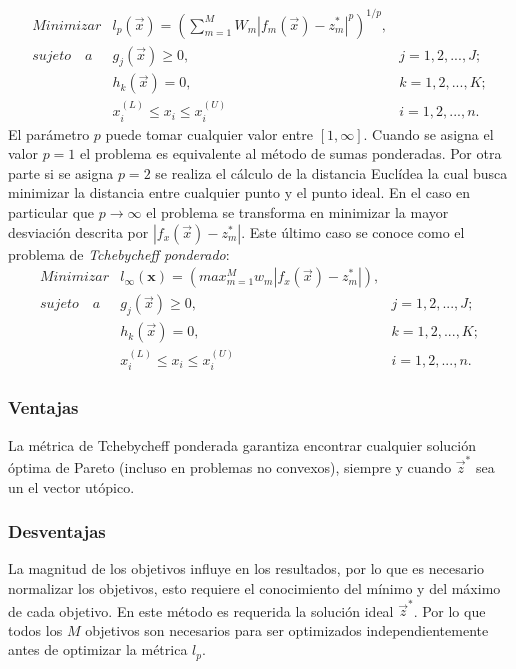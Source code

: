 \begin{equation} \label{eqn:Metodo_Metricas_Ponderadas}
\begin{matrix}
Minimizar         & l_p(\vec{x}) = \left (   \sum_{m=1}^M W_m |f_m( \vec{x} ) - z_m^* |^p \right)  ^{1/p}, 							&  \\
sujeto \quad a 				 & g_j(\vec{x}) \geq 0,                          & j=1, 2, ..., J;\\
                 & h_k(\vec{x}) = 0,                             & k=1,2, ..., K; \\
                 & x_i^{(L)} \leq x_i \leq x_i^{(U)}                & i=1, 2, ..., n.
\end{matrix}
\end{equation}
El parámetro $p$ puede tomar cualquier valor entre $[1, \infty]$.
%
Cuando se asigna el valor $p=1$ el problema es equivalente al método de sumas ponderadas. 
%
Por otra parte si se asigna $p=2$ se realiza el cálculo de la distancia Euclídea la cual busca minimizar la distancia entre cualquier punto y el punto ideal.
%
En el caso en particular que $p \rightarrow \infty$ el problema se transforma en minimizar la mayor desviación descrita por $|f_x(\vec{x}) - z_m^*|$. Este último caso se conoce como el problema de \textit{Tchebycheff ponderado}:
\begin{equation} \label{eqn:Metodo_Tchebycheff_Ponderado}
\begin{matrix}
Minimizar         & l_{ \infty }(\mathbf{x}) = \left ( max_{m=1}^M w_m| f_x(\vec{x}) - z^*_m|   \right), 							&  \\
sujeto \quad a 				 & g_j(\vec{x}) \geq 0,                          & j=1, 2, ..., J;\\
                 & h_k(\vec{x}) = 0,                             & k=1,2, ..., K; \\
                 & x_i^{(L)} \leq x_i \leq x_i^{(U)}                & i=1, 2, ..., n.
\end{matrix}
\end{equation}
\subsubsection*{Ventajas}
La métrica de Tchebycheff ponderada garantiza encontrar cualquier solución óptima de Pareto (incluso en problemas no convexos), siempre y cuando $\vec{z}^*$ sea un el vector utópico.

\subsubsection*{Desventajas}
La magnitud de los objetivos influye en los resultados, por lo que es necesario normalizar los objetivos, esto requiere el conocimiento del mínimo y del máximo de cada objetivo. En este método es requerida la solución ideal $\vec{z}^*$. Por lo que todos los $M$ objetivos son necesarios para ser optimizados independientemente antes de optimizar la métrica $l_p$.

